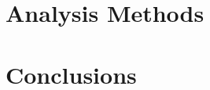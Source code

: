 \documentclass[openany, oneside, 12pt]{book}
\begin{document}
\chapter{Analysis Methods}


% 

\chapter{Conclusions}



% 

% 

%  



\end{document}

